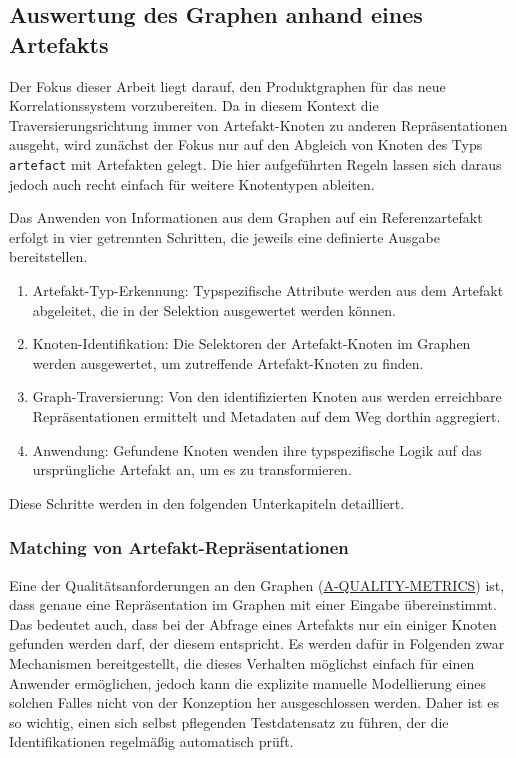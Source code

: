 \subsection{Auswertung des Graphen anhand eines Artefakts}\label{subsec:model-apply-to-artifact}

Der Fokus dieser Arbeit liegt darauf, den Produktgraphen für das neue Korrelationssystem vorzubereiten.
Da in diesem Kontext die Traversierungsrichtung immer von Artefakt-Knoten zu anderen Repräsentationen ausgeht, wird zunächst der Fokus nur auf den Abgleich von Knoten des Typs \texttt{artefact} mit Artefakten gelegt.
Die hier aufgeführten Regeln lassen sich daraus jedoch auch recht einfach für weitere Knotentypen ableiten.

Das Anwenden von Informationen aus dem Graphen auf ein Referenzartefakt erfolgt in vier getrennten Schritten, die jeweils eine definierte Ausgabe bereitstellen.

\begin{enumerate}
    \itemsep0em
    \item Artefakt-Typ-Erkennung: Typspezifische Attribute werden aus dem Artefakt abgeleitet, die in der Selektion ausgewertet werden können.
    \item Knoten-Identifikation: Die Selektoren der Artefakt-Knoten im Graphen werden ausgewertet, um zutreffende Artefakt-Knoten zu finden.
    \item Graph-Traversierung: Von den identifizierten Knoten aus werden erreichbare Repräsentationen ermittelt und Metadaten auf dem Weg dorthin aggregiert.
    \item Anwendung: Gefundene Knoten wenden ihre typspezifische Logik auf das ursprüngliche Artefakt an, um es zu transformieren.
\end{enumerate}

Diese Schritte werden in den folgenden Unterkapiteln detailliert.

\subsubsection{Matching von Artefakt-Repräsentationen}\label{subsubsec:model-matching}

Eine der Qualitätsanforderungen an den Graphen (\hyperref[subsec:req-graph-inner-consistency]{A-QUALITY-METRICS}) ist, dass genaue eine Repräsentation im Graphen mit einer Eingabe übereinstimmt.
Das bedeutet auch, dass bei der Abfrage eines Artefakts nur ein einiger Knoten gefunden werden darf, der diesem entspricht.
Es werden dafür in Folgenden zwar Mechanismen bereitgestellt, die dieses Verhalten möglichst einfach für einen Anwender ermöglichen, jedoch kann die explizite manuelle Modellierung eines solchen Falles nicht von der Konzeption her ausgeschlossen werden.
Daher ist es so wichtig, einen sich selbst pflegenden Testdatensatz zu führen, der die Identifikationen regelmäßig automatisch prüft.

